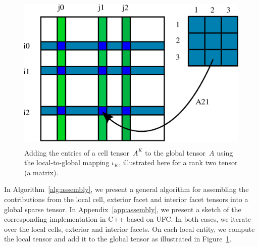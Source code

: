 \begin{figure}[htbp]
  \begin{center}
    \includegraphics[height=3in]{eps/insertion.eps}
    \caption{Adding the entries of a cell tensor~$A^K$ to the
      global tensor~$A$ using the  local-to-global mapping
      $\iota_K$, illustrated here for a rank two
      tensor (a matrix).}
    \label{fig:insertion}
  \end{center}
\end{figure}

In Algorithm~\ref{alg:assembly}, we present a general algorithm for
assembling the contributions from the local cell, exterior facet and
interior facet tensors into a global sparse tensor. In
Appendix~\ref{app:assembly}, we present a sketch of the corresponding
implementation in C++ based on UFC. In both cases, we iterate over the
local cells, exterior and interior facets. On each local entity, we
compute the local tensor and add it to the global tensor as
illustrated in Figure~\ref{fig:insertion}.

